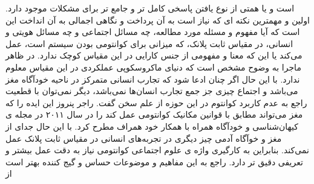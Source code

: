 \documentclass[a4paper,titlepage,12pt,fleqn,oneside]{report}
\begin{document}
است و یا همتی از نوع یافتن پاسخی کامل تر و جامع تر برای مشکلات موجود دارد. اولین و مهمترین نکته ای که نیاز است به آن پرداخت و نگاهی اجمالی به آن انداخت این است که آیا مفهوم و مسئله مورد مطالعه، چه مسائل اجتماعی و چه مسائل هویتی و انسانی، در مقیاس ثابت پلانک، که میزانی برای کوانتومی بودن سیستم است، عمل می‌کند یا این که معنا و مفهومی از جنس کارایی در این مقیاس کوچک ندارد. در ظاهر ماجرا به وضوح مشخص است که دنیای ماکروسکوپی عملکردی در این مقیاس معلوم ندارد. با این حال اگر چنان ادعا شود که تجارب انسانی متمرکز در ناحیه خودآگاه مغز می‌باشد و اجتماع چیزی جز جمع تجارب انسان‌ها نمی‌باشد، دیگر نمی‌توان با قطعیت راجع به عدم کاربرد کوانتوم در این حوزه از علم سخن گفت. راجر پنروز این ایده را که مغز می‌تواند مطابق با قوانین مکانیک کوانتومی عمل کند\cite{penrose} را در سال ۲۰۱۱ در مجله ی کیهان‌شناسی و خودآگاه همراه با همکار خود همراف مطرح کرد\cite{hamrof}. با این حال جدای از مغز و خوآگاه آدمی چیز دیگری در تجربه‌های انسانی در مقیاس ثابت پلانک عمل نمی‌کند. بنابراین به کارگیری واژه ی علوم اجتماعی کوانتومی نیاز به دقت عمل بیشتر و تعریفی دقیق تر دارد.  
	راجع به این مفاهیم و موضوعات حساس و گیج کننده بهتر است از
	
\end{document}
